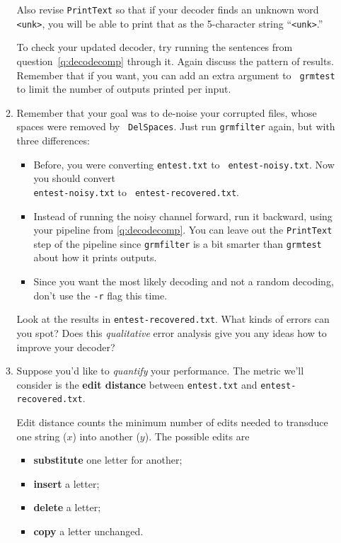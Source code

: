 \documentclass[11pt]{article}
\newcommand{\handinsym}{\color{blue}{\HandLeftUp}}
\newcounter{handin}
\newcommand{\handin}{\stepcounter{handin}\hspace{0pt}\marginpar{\hfill\handinsym$_{\arabic{handin}}$}}
\begin{document}
\begin{enumerate}[resume]
\begin{enumerate}[resume]
    Also revise {\tt PrintText} so that if your decoder finds an
    unknown word {\tt <unk>}, you will be able to print that as the
    5-character string ``{\tt <unk>}.''

    To check your updated decoder, try running the
    sentences from question~\ref{q:decodecomp} through it.  Again discuss the pattern of results.
    Remember that if you want, you can add an extra argument to {\tt
      grmtest} to limit the number of outputs printed per input.


  \item \label{q:qualitativeedit} Remember that your goal was to
    de-noise your corrupted files, whose spaces were removed by {\tt
      DelSpaces}.  Just run \verb/grmfilter/ again, but with three
    differences:
    \begin{itemize}
    \item Before, you were converting {\tt entest.txt} to {\tt
        entest-noisy.txt}.
      Now you should convert \\{\tt entest-noisy.txt} to {\tt
        entest-recovered.txt}.
    \item Instead of running the noisy channel forward, run it
      backward, using your pipeline from \ref{q:decodecomp}.
      You can leave out the {\tt PrintText} step of the pipeline
      since {\tt grmfilter} is a bit smarter than {\tt grmtest} about
      how it prints outputs.
    \item Since you want the most likely decoding
      and not a random decoding, don't use the {\tt -r} flag this time.
    \end{itemize}

    Look at the results in {\tt entest-recovered.txt}.  \handin What kinds of
    errors can you spot?  Does this {\em qualitative} error analysis give
    you any ideas how to improve your decoder?

  \item Suppose you'd like to {\em quantify} your performance.  The metric
    we'll consider is the {\bf edit distance} between {\tt entest.txt}
    and {\tt entest-recovered.txt}.

    Edit distance counts the minimum number of edits needed to
    transduce one string ($x$) into another ($y$). The possible edits
    are
    \begin{itemize}
    \item \textbf{substitute} one letter for another;
    \item \textbf{insert} a letter;
    \item \textbf{delete} a letter;
    \item \textbf{copy} a letter unchanged.
    \end{itemize}


\end{enumerate}
\end{enumerate}
\end{document}
